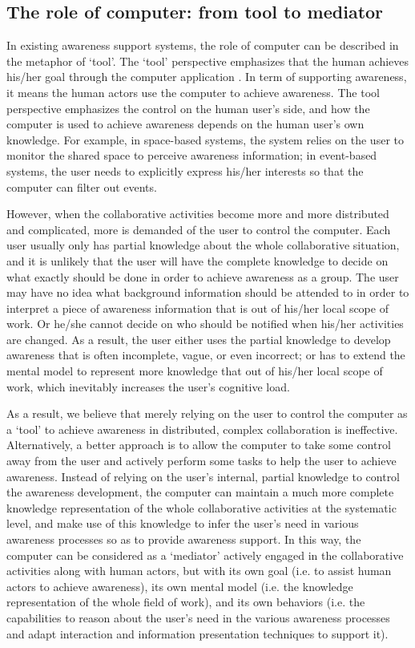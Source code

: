 \subsection{The role of computer: from tool to mediator} %
\label{sub:the_role_of_computer}
In existing awareness support systems, the role of computer can be described in the metaphor of `tool'. The `tool' perspective emphasizes that the human achieves his/her goal through the computer application \cite{Bodker1997}. In term of supporting awareness, it means the human actors use the computer to achieve awareness. The tool perspective emphasizes the control on the human user's side, and how the computer is used to achieve awareness depends on the human user's own knowledge. For example, in space-based systems, the system relies on the user to monitor the shared space to perceive awareness information; in event-based systems, the user needs to explicitly express his/her interests so that the computer can filter out events. 

However, when the collaborative activities become more and more distributed and complicated, more is demanded of the user to control the computer. Each user usually only has partial knowledge about the whole collaborative situation, and it is unlikely that the user will have the complete knowledge to decide on what exactly should be done in order to achieve awareness as a group. The user may have no idea what background information should be attended to in order to interpret a piece of awareness information that is out of his/her local scope of work. Or he/she cannot decide on who should be notified when his/her activities are changed. As a result, the user either uses the partial knowledge to develop awareness that is often incomplete, vague, or even incorrect; or has to extend the mental model to represent more knowledge that out of his/her local scope of work, which inevitably increases the user's cognitive load. 

As a result, we believe that merely relying on the user to control the computer as a `tool' to achieve awareness in distributed, complex collaboration is ineffective. Alternatively, a better approach is to allow the computer to take some control away from the user and actively perform some tasks to help the user to achieve awareness. Instead of relying on the user's internal, partial knowledge to control the awareness development, the computer can maintain a much more complete knowledge representation of the whole collaborative activities at the systematic level, and make use of this knowledge to infer the user's need in various awareness processes so as to provide awareness support. In this way, the computer can be considered as a `mediator' actively engaged in the collaborative activities along with human actors, but with its own goal (i.e. to assist human actors to achieve awareness), its own mental model (i.e. the knowledge representation of the whole field of work), and its own behaviors (i.e. the capabilities to reason about the user's need in the various awareness processes and adapt interaction and information presentation techniques to support it).

